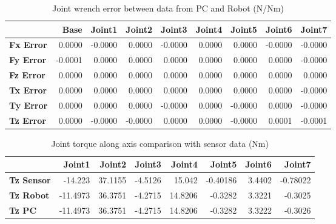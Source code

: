 \begin{table}[h!]
	\centering
	\caption{Joint wrench error between data from PC and Robot (N/Nm)}
	\label{wrech_Error_Pose12}
	\begin{tabular}{|l|r|r|r|r|r|r|r|r|}
		\hline
		\textbf{}  & \textbf{Base} & \textbf{Joint1}  & \textbf{Joint2}  & \textbf{Joint3}  & \textbf{Joint4}  & \textbf{Joint5}  & \textbf{Joint6}  & \textbf{Joint7} \\ \hline
		\textbf{Fx Error}  & 0.0000        & -0.0000        & 0.0000        & -0.0000        & 0.0000        & 0.0000        & -0.0000        & -0.0000 \\ \hline
		\textbf{Fy Error}  & -0.0001        & 0.0000        & 0.0000        & 0.0000        & 0.0000        & 0.0000        & 0.0000        & -0.0000 \\ \hline
		\textbf{Fz Error}  & 0.0000        & 0.0000        & 0.0000        & 0.0000        & 0.0000        & 0.0000        & 0.0000        & 0.0000 \\ \hline
		\textbf{Tx Error}  & 0.0000        & 0.0000        & 0.0000        & 0.0000        & 0.0000        & 0.0000        & 0.0000        & -0.0000 \\ \hline
		\textbf{Ty Error}  & 0.0000        & 0.0000        & 0.0000        & -0.0000        & 0.0000        & -0.0000        & 0.0000        & -0.0000 \\ \hline
		\textbf{Tz Error}  & 0.0000        & -0.0000        & -0.0000        & 0.0000        & 0.0000        & -0.0000        & 0.0001        & -0.0001 \\ \hline
	\end{tabular}
\end{table}

\begin{table}[h!]
	\centering
	\caption{Joint torque along axis comparison with sensor data (Nm)}
	\label{wrech_Sensor_Pose12}
	\begin{tabular}{|l|r|r|r|r|r|r|r|}
		\hline
		\textbf{} & \textbf{Joint1} & \textbf{Joint2} & \textbf{Joint3} & \textbf{Joint4} & \textbf{Joint5} & \textbf{Joint6} & \textbf{Joint7} \\ \hline
		\textbf{Tz Sensor}  & -14.223           & 37.1155           & -4.5126            & 15.042           & -0.40186           & 3.4402           & -0.78022           \\ \hline
		\textbf{Tz Robot}  	& -11.4973           & 36.3751           & -4.2715            & 14.8206           & -0.3282           & 3.3221           & -0.3025           \\ \hline
		\textbf{Tz PC}  	& -11.4973           & 36.3751           & -4.2715            & 14.8206           & -0.3282           & 3.3222           & -0.3026           \\ \hline
	\end{tabular}
\end{table}

